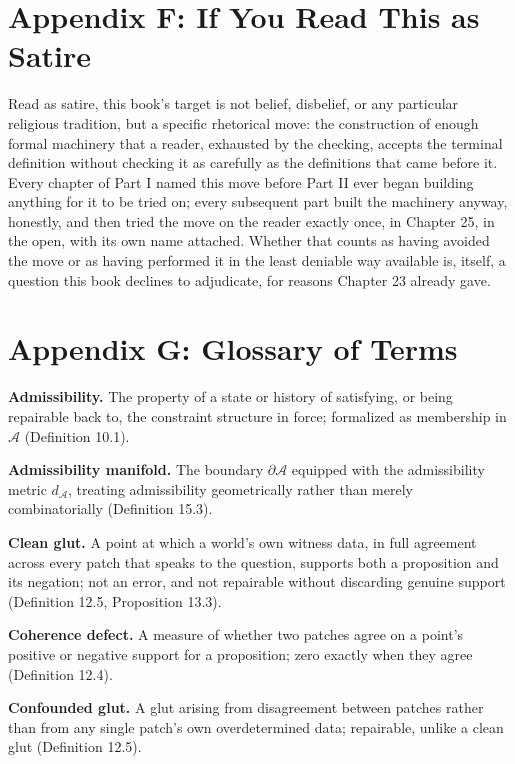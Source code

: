 \documentclass[11pt]{book}
\begin{document}
\chapter*{Appendix F: If You Read This as Satire}

Read as satire, this book's target is not belief, disbelief, or any particular religious tradition, but a specific rhetorical move: the construction of enough formal machinery that a reader, exhausted by the checking, accepts the terminal definition without checking it as carefully as the definitions that came before it. Every chapter of Part I named this move before Part II ever began building anything for it to be tried on; every subsequent part built the machinery anyway, honestly, and then tried the move on the reader exactly once, in Chapter 25, in the open, with its own name attached. Whether that counts as having avoided the move or as having performed it in the least deniable way available is, itself, a question this book declines to adjudicate, for reasons Chapter 23 already gave.



\chapter*{Appendix G: Glossary of Terms}

\textbf{Admissibility.} The property of a state or history of satisfying, or being repairable back to, the constraint structure in force; formalized as membership in $\mathcal A$ (Definition 10.1).

\textbf{Admissibility manifold.} The boundary $\partial\mathcal A$ equipped with the admissibility metric $d_{\mathcal A}$, treating admissibility geometrically rather than merely combinatorially (Definition 15.3).

\textbf{Clean glut.} A point at which a world's own witness data, in full agreement across every patch that speaks to the question, supports both a proposition and its negation; not an error, and not repairable without discarding genuine support (Definition 12.5, Proposition 13.3).

\textbf{Coherence defect.} A measure of whether two patches agree on a point's positive or negative support for a proposition; zero exactly when they agree (Definition 12.4).

\textbf{Confounded glut.} A glut arising from disagreement between patches rather than from any single patch's own overdetermined data; repairable, unlike a clean glut (Definition 12.5).
\end{document}
